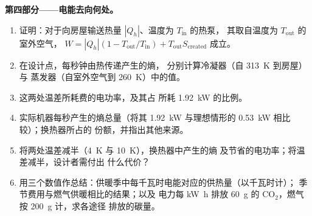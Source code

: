 \begin{problem}
\medskip
\noindent\textbf{第四部分——电能去向何处。}
\begin{enumerate}[resume]
  \item 证明：对于向房屋输送热量 $|Q_h|$、温度为 $T_{\mathrm{in}}$ 的热泵，
        其取自温度为 $T_{\mathrm{out}}$ 的室外空气，
        $W = |Q_h|(1 - T_{\mathrm{out}}/T_{\mathrm{in}}) + T_{\mathrm{out}}S_{\mathrm{created}}$ 成立。
  \item 在设计点，每秒钟由热传递产生的熵，
        分别计算冷凝器（自 \qty{313}{K} 到房屋）与
        蒸发器（自室外空气到 \qty{260}{K}）中的值。
  \item 这两处温差所耗费的电功率，及其占
        所耗 \qty{1.92}{kW} 的比例。
  \item 实际机器每秒产生的熵总量（将其
        \qty{1.92}{kW} 与理想情形的 \qty{0.53}{kW} 相比较）；换热器所占的
        份额，并指出其他来源。
  \item 将两处温差减半（\qty{4}{K} 与 \qty{10}{K}），换热器中产生的熵
        及节省的电功率；将温差减半，设计者需付出
        什么代价？
  \item 用三个数值作总结：供暖季中每千瓦时电能对应的供热量（以千瓦时计）；
        季节费用与燃气供暖相比的结果；以及
        电力每
        \unit{kW h} 排放 \qty{60}{g} 的 CO$_2$，燃气按 \qty{200}{g} 计，求各途径
        排放的碳量。
\end{enumerate}
\end{problem}
